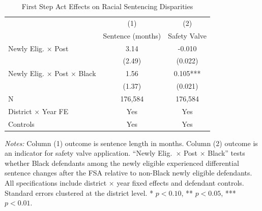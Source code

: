 \begin{table}[H]
\centering
\caption{First Step Act Effects on Racial Sentencing Disparities}
\label{tab:race}
\begin{threeparttable}
\begin{tabular}{lcc}
\toprule
 & (1) & (2) \\
 & Sentence (months) & Safety Valve \\
\midrule
Newly Elig. $\times$ Post & 3.14 & -0.010 \\
 & (2.49) & (0.022) \\
Newly Elig. $\times$ Post $\times$ Black & 1.56 & 0.105*** \\
 & (1.37) & (0.021) \\
\midrule
N & 176,584 & 176,584 \\
District $\times$ Year FE & Yes & Yes \\
Controls & Yes & Yes \\
\bottomrule
\end{tabular}
\begin{tablenotes}[flushleft]
\small
\item \textit{Notes:} Column (1) outcome is sentence length in months. Column (2) outcome is an indicator for safety valve application. ``Newly Elig.\ $\times$ Post $\times$ Black'' tests whether Black defendants among the newly eligible experienced differential sentence changes after the FSA relative to non-Black newly eligible defendants. All specifications include district $\times$ year fixed effects and defendant controls. Standard errors clustered at the district level. * $p<0.10$, ** $p<0.05$, *** $p<0.01$.
\end{tablenotes}
\end{threeparttable}
\end{table}
